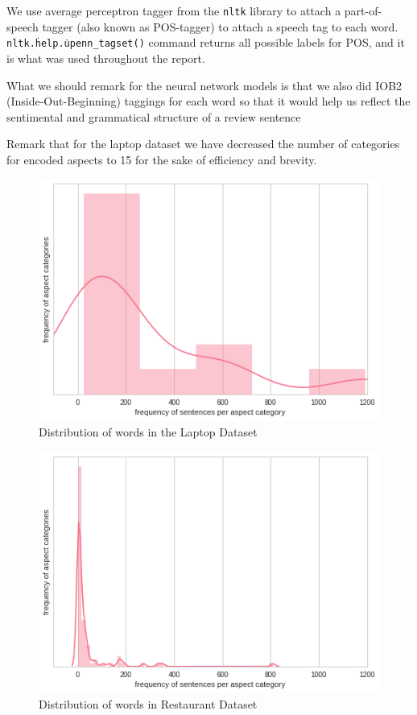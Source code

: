 \documentclass[comsoc,conference]{IEEEtran}
\begin{document}
We use average perceptron tagger from the \texttt{nltk} library to attach a part-of-speech tagger (also known as POS-tagger) to attach a speech tag to each word. \texttt{nltk.\.help.\.upenn\_tagset()} command returns all possible labels for POS, and it is what was used throughout the report.
\par What we should remark for the neural network models is that we also did IOB2 (Inside-Out-Beginning) taggings for each word so that it would help us reflect the sentimental and grammatical structure of a review sentence
\par Remark that for the laptop dataset we have decreased the number of categories for encoded aspects to 15 for the sake of efficiency and brevity. 
\begin{figure}[hp]
\centering
\includegraphics[scale=0.45]{images/anal_asp-freq_REST.png}
\caption{Distribution of words in the Laptop Dataset}
\end{figure}
\begin{figure}[hp]
\centering
\includegraphics[scale=0.45]{images/anal_asp-freq_LAPT.png}
\caption{Distribution of words in Restaurant Dataset}
\end{figure}
\end{document}
